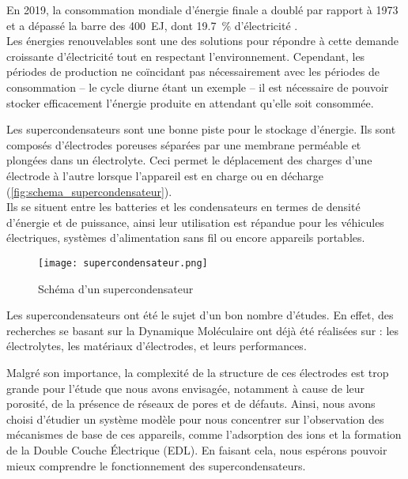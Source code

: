 En 2019, la consommation mondiale d'énergie finale a doublé par rapport à 1973 et a dépassé la barre des \qty{400}{\exa \joule}, dont \qty{19.7}{\percent} d'électricité \cite{birol_key_nodate}.\\
Les énergies renouvelables sont une des solutions pour répondre à cette demande croissante d'électricité tout en respectant l'environnement. Cependant, les périodes de production ne coïncidant pas nécessairement avec les périodes de consommation -- le cycle diurne étant un exemple -- il est nécessaire de pouvoir stocker efficacement l'énergie produite en attendant qu'elle soit consommée.

Les supercondensateurs sont une bonne piste pour le stockage d'énergie. Ils sont composés d'électrodes poreuses séparées par une membrane perméable et plongées dans un électrolyte. Ceci permet le déplacement des charges d'une électrode à l'autre lorsque l'appareil est en charge ou en décharge (\autoref{fig:schema_supercondensateur}).\\
Ils se situent entre les batteries et les condensateurs en termes de densité d'énergie et de puissance, ainsi leur utilisation est répandue pour les véhicules électriques, systèmes d'alimentation sans fil ou encore appareils portables.

\begin{figure}[hb]
    \centering
    \texttt{[image: supercondensateur.png]}
    \caption{Schéma d'un supercondensateur}
    \label{fig:schema_supercondensateur}
\end{figure}

Les supercondensateurs ont été le sujet d'un bon nombre d'études. En effet, des recherches se basant sur la Dynamique Moléculaire ont déjà été réalisées sur : les électrolytes\cite{zhong_review_2015}, les matériaux d'électrodes\cite{iro_brief_2016}, et leurs performances\cite{zhang_review_2018}.

Malgré son importance, la complexité de la structure de ces électrodes est trop grande pour l'étude que nous avons envisagée, notamment à cause de leur porosité, de la présence de réseaux de pores et de défauts\cite{bo_design_2018}. Ainsi, nous avons choisi d'étudier un système modèle pour nous concentrer sur l'observation des mécanismes de base de ces appareils, comme l'adsorption des ions et la formation de la Double Couche Électrique (EDL). En faisant cela, nous espérons pouvoir mieux comprendre le fonctionnement des supercondensateurs.

